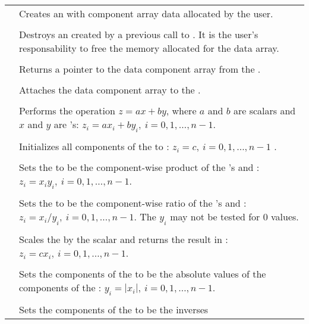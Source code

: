 \begin{supertabular}{|p{\colone}|p{\coltwo}|}
{& Creates an  with component array data 
 allocated by the user.
\\
%
 &  \\
& Destroys an  created by a previous call to . 
It is the user's responsability to free the memory allocated for the data array.
\\
%
 &  \\
& Returns a pointer to the data component array from the  .
\\
%
 &  \\
& Attaches the data component array  to the  .
\\
%
 &  \\
& Performs the operation $z = a x + b y$, where $a$ and $b$ are scalars
and $x$ and $y$ are 's:
$z_i = a x_i + b y_i, \: i=0,1,\ldots,n-1$.
\\
%
 &  \\
& Initializes all components of the   to :
$z_i = c,\: i=0,1,\ldots,n-1$ .
\\
%
 &  \\
& Sets the   to be the component-wise product of the
's  and :
$z_i = x_i y_i,\: i=0,1,\ldots,n-1$.
\\
%
 &  \\
& Sets the   to be the component-wise ratio of the
's  and :
$z_i = x_i / y_i,\: i=0,1,\ldots,n-1$. The $y_i$ may not be tested 
for $0$ values.
\\
%
 &  \\
& Scales the   by the scalar  and returns
the result in :
$z_i = c x_i , \: i=0,1,\ldots,n-1$.
\\
%
 &  \\
& Sets the components of the   to be the absolute
values of the components of the  :
$y_i = | x_i | , \: i=0,1,\ldots,n-1$.
\\
%
 &  \\
& Sets the components of the   to be the inverses
}
\end{supertabular}
